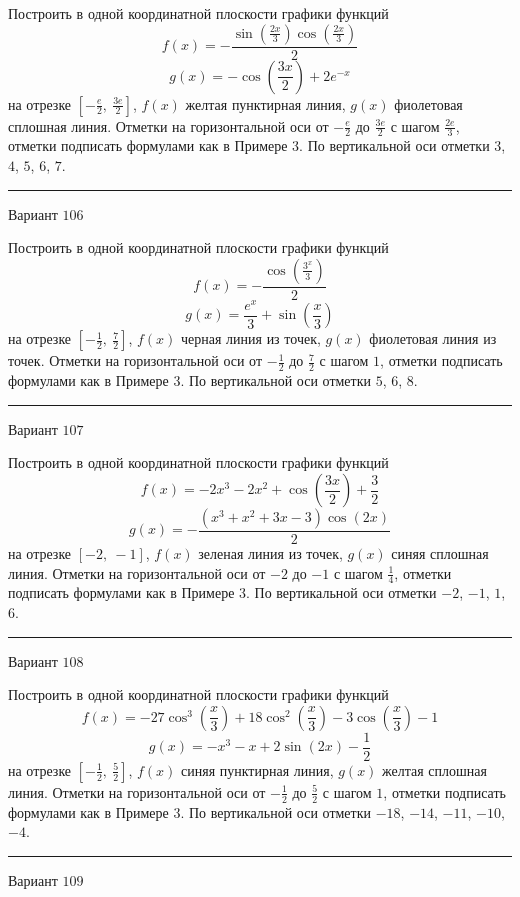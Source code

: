 \documentclass[11pt]{report}
\begin{document}
Построить в одной координатной плоскости графики функций $$f(x) = - \frac{\sin{\left(\frac{2 x}{3} \right)} \cos{\left(\frac{2 x}{3} \right)}}{2}$$ $$g(x) = - \cos{\left(\frac{3 x}{2} \right)} + 2 e^{- x}$$ на отрезке $\left[- \frac{e}{2}, \  \frac{3 e}{2}\right]$, $f(x)$ желтая пунктирная линия, $g(x)$ фиолетовая сплошная линия. Отметки на горизонтальной оси от $- \frac{e}{2}$ до $\frac{3 e}{2}$ с шагом $\frac{2 e}{3}$, отметки подписать формулами как в Примере 3. По вертикальной оси отметки $3$, $4$, $5$, $6$, $7$.
\begin{center}
\noindent\rule{8cm}{0.4pt}
\end{center}
Вариант $106$


Построить в одной координатной плоскости графики функций $$f(x) = - \frac{\cos{\left(\frac{3^{x}}{3} \right)}}{2}$$ $$g(x) = \frac{e^{x}}{3} + \sin{\left(\frac{x}{3} \right)}$$ на отрезке $\left[- \frac{1}{2}, \  \frac{7}{2}\right]$, $f(x)$ черная линия из точек, $g(x)$ фиолетовая линия из точек. Отметки на горизонтальной оси от $- \frac{1}{2}$ до $\frac{7}{2}$ с шагом $1$, отметки подписать формулами как в Примере 3. По вертикальной оси отметки $5$, $6$, $8$.
\begin{center}
\noindent\rule{8cm}{0.4pt}
\end{center}
Вариант $107$


Построить в одной координатной плоскости графики функций $$f(x) = - 2 x^{3} - 2 x^{2} + \cos{\left(\frac{3 x}{2} \right)} + \frac{3}{2}$$ $$g(x) = - \frac{\left(x^{3} + x^{2} + 3 x - 3\right) \cos{\left(2 x \right)}}{2}$$ на отрезке $\left[-2, \  -1\right]$, $f(x)$ зеленая линия из точек, $g(x)$ синяя сплошная линия. Отметки на горизонтальной оси от $-2$ до $-1$ с шагом $\frac{1}{4}$, отметки подписать формулами как в Примере 3. По вертикальной оси отметки $-2$, $-1$, $1$, $6$.
\begin{center}
\noindent\rule{8cm}{0.4pt}
\end{center}
Вариант $108$


Построить в одной координатной плоскости графики функций $$f(x) = - 27 \cos^{3}{\left(\frac{x}{3} \right)} + 18 \cos^{2}{\left(\frac{x}{3} \right)} - 3 \cos{\left(\frac{x}{3} \right)} - 1$$ $$g(x) = - x^{3} - x + 2 \sin{\left(2 x \right)} - \frac{1}{2}$$ на отрезке $\left[- \frac{1}{2}, \  \frac{5}{2}\right]$, $f(x)$ синяя пунктирная линия, $g(x)$ желтая сплошная линия. Отметки на горизонтальной оси от $- \frac{1}{2}$ до $\frac{5}{2}$ с шагом $1$, отметки подписать формулами как в Примере 3. По вертикальной оси отметки $-18$, $-14$, $-11$, $-10$, $-4$.
\begin{center}
\noindent\rule{8cm}{0.4pt}
\end{center}
Вариант $109$
\end{document}
